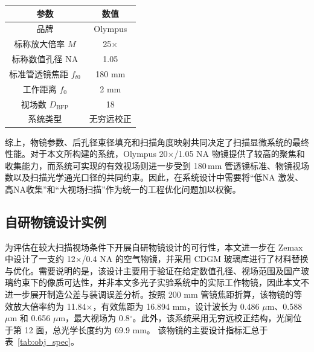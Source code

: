 \begin{table}[htbp]
\label{tab:olympus_obj}
\centering
\begin{tabular}{|c|c|}
\hline
参数 & 数值 \\ \hline
品牌 & Olympus \\ \hline
标称放大倍率 $M$ & 25$\times$ \\ \hline
标称数值孔径 NA & 1.05 \\ \hline
标准管透镜焦距 $f_{t0}$ & 180 mm \\ \hline
工作距离 $f_0$ & 2 mm \\ \hline
视场数 $D_{\mathrm{BFP}}$ & 18 \\ \hline
系统类型 & 无穷远校正 \\ \hline
\end{tabular}
\end{table}

综上，物镜参数、后孔径束径填充和扫描角度映射共同决定了扫描显微系统的最终性能。对于本文所构建的系统，Olympus 20$\times$/1.05 NA 物镜提供了较高的聚焦和收集能力，而系统可实现的有效视场则进一步受到 180\,mm 管透镜标准、物镜视场数以及扫描光学通光口径的共同约束。因此，在系统设计中需要将``低NA 激发、高NA收集''和``大视场扫描''作为统一的工程优化问题加以权衡。


\subsection{自研物镜设计实例}\label{2.4.5}

为评估在较大扫描视场条件下开展自研物镜设计的可行性，本文进一步在 Zemax 中设计了一支约 12$\times$/0.4 NA 的空气物镜，并采用 CDGM 玻璃库进行了材料替换与优化。需要说明的是，该设计主要用于验证在给定数值孔径、视场范围及国产玻璃约束下的像质可达性，并非本文多光子实验系统中的实际工作物镜，因此本文不进一步展开制造公差与装调误差分析。按照 200 mm 管镜焦距折算，该物镜的等效放大倍率约为 11.84$\times$，有效焦距为 16.894 mm，设计波长为 0.486 $\mu$m、0.588 $\mu$m 和 0.656 $\mu$m，最大视场为 0.8$^\circ$。此外，该系统采用无穷远校正结构，光阑位于第 12 面，总光学长度约为 69.9 mm。 该物镜的主要设计指标汇总于表~\ref{tab:obj_spec}。

